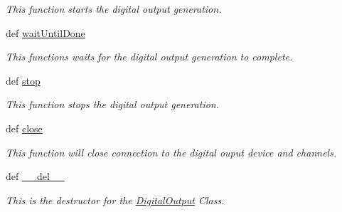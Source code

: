 \begin{DoxyCompactItemize}
\begin{DoxyCompactList}\small\item\em This function starts the digital output generation. \end{DoxyCompactList}\item 
def \hyperlink{class_digital_output_1_1_digital_output_a6a179ee4c172d0c99d20267d34437ad1}{wait\-Until\-Done}
\begin{DoxyCompactList}\small\item\em This functions waits for the digital output generation to complete. \end{DoxyCompactList}\item 
def \hyperlink{class_digital_output_1_1_digital_output_a7f5784b1fdea30aaddc1d608357accf1}{stop}
\begin{DoxyCompactList}\small\item\em This function stops the digital output generation. \end{DoxyCompactList}\item 
def \hyperlink{class_digital_output_1_1_digital_output_a5385404bf2191f7f6b23a30041599bab}{close}
\begin{DoxyCompactList}\small\item\em This function will close connection to the digital ouput device and channels. \end{DoxyCompactList}\item 
def \hyperlink{class_digital_output_1_1_digital_output_a4aea66b269b7202475ace284a26b87be}{\-\_\-\-\_\-del\-\_\-\-\_\-}
\begin{DoxyCompactList}\small\item\em This is the destructor for the \hyperlink{class_digital_output_1_1_digital_output}{Digital\-Output} Class. \end{DoxyCompactList}\end{DoxyCompactItemize}
